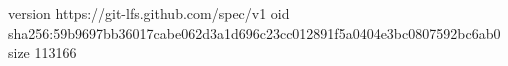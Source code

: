 version https://git-lfs.github.com/spec/v1
oid sha256:59b9697bb36017cabe062d3a1d696c23cc012891f5a0404e3bc0807592bc6ab0
size 113166
